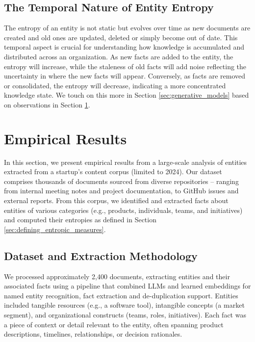 \documentclass[11pt,a4paper]{article}
\begin{document}
\subsection{The Temporal Nature of Entity Entropy}

The entropy of an entity is not static but evolves over time as new documents are created and old ones are updated, deleted or simply become out of date. This temporal aspect is crucial for understanding how knowledge is accumulated and distributed across an organization. As new facts are added to the entity, the entropy will increase, while the staleness of old facts will add noise reflecting the uncertainty in where the new facts will appear. Conversely, as facts are removed or consolidated, the entropy will decrease, indicating a more concentrated knowledge state. We touch on this more in Section \ref{sec:generative_models} based on observations in Section \ref{sec:empirical_results}.

\FloatBarrier
\section{Empirical Results} \label{sec:empirical_results}

In this section, we present empirical results from a large-scale analysis of entities extracted from a startup's content corpus (limited to 2024). Our dataset comprises thousands of documents sourced from diverse repositories -- ranging from internal meeting notes and project documentation, to GitHub issues and external reports. From this corpus, we identified and extracted facts about entities of various categories (e.g., products, individuals, teams, and initiatives) and computed their entropies as defined in Section \ref{sec:defining_entropic_measures}.

\subsection{Dataset and Extraction Methodology}

We processed approximately 2,400 documents, extracting entities and their associated facts using a pipeline that combined LLMs and learned embeddings for named entity recognition, fact extraction and de-duplication support. Entities included tangible resources (e.g., a software tool), intangible concepts (a market segment), and organizational constructs (teams, roles, initiatives). Each fact was a piece of context or detail relevant to the entity, often spanning product descriptions, timelines, relationships, or decision rationales.
\end{document}
